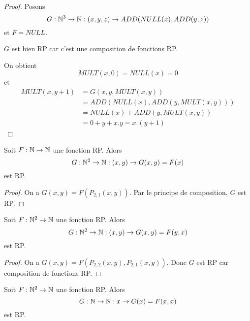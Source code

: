 \ifdefined\outputproof
\begin{proof}
	Posons
	\begin{equation}
		G : \mathbb{N}^{3} \rightarrow \mathbb{N} : (x, y, z) \rightarrow
		ADD(NULL(x), ADD(y, z))
	\end{equation}
	et $F = NULL$.

	$G$ est bien RP car c'est une composition de fonctions RP.

	On obtient
	\begin{equation}
		MULT(x, 0) = NULL(x) = 0
	\end{equation}
	et
	\begin{align}
		MULT(x, y + 1) & = G(x, y, MULT(x, y)) \\
		& = ADD(NULL(x), ADD(y, MULT(x, y))) \\
		& = NULL(x) + ADD(y, MULT(x, y)) \\
		& = 0 + y + x . y = x . (y + 1)
	\end{align}
\end{proof}
\fi

\begin{exemple} 
	Soit $F : \mathbb{N} \rightarrow \mathbb{N}$ une fonction RP. Alors
	\begin{equation}
		G : \mathbb{N}^{2} \rightarrow \mathbb{N} : (x, y) \rightarrow G(x,
		y) = F(x)
	\end{equation}
	est RP.
\end{exemple}

\ifdefined\outputproof
\begin{proof}
	On a $G(x, y) = F(P_{2, 1}(x, y))$. Par le principe de composition, $G$ est
	RP.
\end{proof}
\fi

\begin{exemple} 
	Soit $F : \mathbb{N}^{2} \rightarrow \mathbb{N}$ une fonction RP. Alors
	\begin{equation}
		G : \mathbb{N}^{2} \rightarrow \mathbb{N} : (x, y) \rightarrow G(x,
		y) = F(y, x)
	\end{equation}
	est RP.
\end{exemple}

\ifdefined\outputproof
\begin{proof}
	On a $G(x, y) = F(P_{2, 2}(x, y), P_{2, 1}(x, y))$. Donc $G$ est RP car
	composition de fonctions RP.
\end{proof}
\fi

\begin{exemple} [Diagonale]
	Soit $F : \mathbb{N}^{2} \rightarrow \mathbb{N}$ une fonction RP. Alors
	\begin{equation}
		G : \mathbb{N} \rightarrow \mathbb{N} : x \rightarrow G(x) = F(x, x)
	\end{equation}
	est RP.
\end{exemple}

